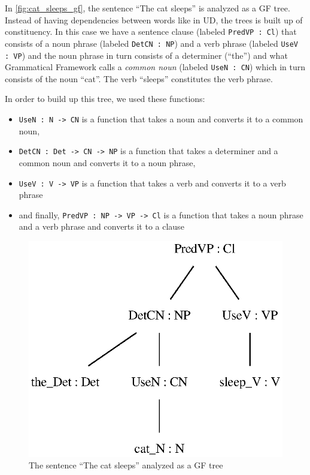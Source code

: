 In \autoref{fig:cat_sleeps_gf}, the sentence ``The cat sleeps'' is analyzed as a GF tree. Instead of having dependencies between words like in UD, the trees is built up of constituency. In this case we have a sentence clause (labeled \verb|PredVP : Cl|) that consists of a noun phrase (labeled \verb|DetCN : NP|) and a verb phrase (labeled \verb|UseV : VP|) and the noun phrase in turn consists of a determiner (``the'') and what Grammatical Framework calls a \emph{common noun} (labeled \verb|UseN : CN|) which in turn consists of the noun ``cat''. The verb ``sleeps'' constitutes the verb phrase.

In order to build up this tree, we used these functions:
\begin{itemize}
    \item  \verb|UseN : N -> CN| is a function that takes a noun and converts it to a common noun, 
    \item \verb|DetCN : Det -> CN -> NP| is a function that takes a determiner and a common noun and converts it to a noun phrase, 
    \item \verb|UseV : V -> VP| is a function that takes a verb and converts it to a verb phrase
    \item and finally, \verb|PredVP : NP -> VP -> Cl| is a function that takes a noun phrase and a verb phrase and converts it to a clause 
\end{itemize}

\begin{figure}[htb]
  \centering
  \includegraphics[width=0.5\linewidth]{thesis/figure/cat_sleeps_cl.eps}
  \caption{The sentence ``The cat sleeps'' analyzed as a GF tree}
  \label{fig:cat_sleeps_gf}
\end{figure}


%

